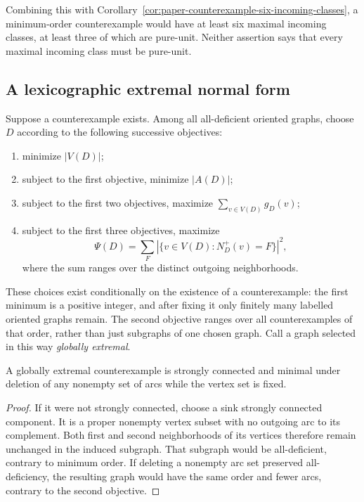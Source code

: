 Combining this with Corollary~\ref{cor:paper-counterexample-six-incoming-classes},
a minimum-order counterexample would have at least six maximal incoming
classes, at least three of which are pure-unit. Neither assertion says
that every maximal incoming class must be pure-unit.

\subsection{A lexicographic extremal normal form}

Suppose a counterexample exists. Among all all-deficient oriented graphs,
choose $D$ according to the following successive objectives:
\begin{enumerate}
 \item minimize $|V(D)|$;
 \item subject to the first objective, minimize $|A(D)|$;
 \item subject to the first two objectives, maximize
       $\sum_{v\in V(D)}g_D(v)$;
 \item subject to the first three objectives, maximize
       \[
        \Psi(D)=\sum_F
              |\{v\in V(D):N_D^+(v)=F\}|^2,
       \]
       where the sum ranges over the distinct outgoing neighborhoods.
\end{enumerate}
These choices exist conditionally on the existence of a counterexample:
the first minimum is a positive integer, and after fixing it only finitely
many labelled oriented graphs remain. The second objective ranges over
all counterexamples of that order, rather than just subgraphs of one
chosen graph. Call a graph selected in this way \emph{globally extremal}.

\begin{lemma}
\label{lem:paper-extremal-connectivity}
A globally extremal counterexample is strongly connected and minimal
under deletion of any nonempty set of arcs while the vertex set is fixed.
\end{lemma}
\begin{proof}
If it were not strongly connected, choose a sink strongly connected
component. It is a proper nonempty vertex subset with no outgoing arc
to its complement. Both first and second neighborhoods of its vertices
therefore remain unchanged in the induced subgraph. That subgraph
would be all-deficient, contrary to minimum order. If deleting a
nonempty arc set preserved all-deficiency, the resulting graph would
have the same order and fewer arcs, contrary to the second objective.
\end{proof}

